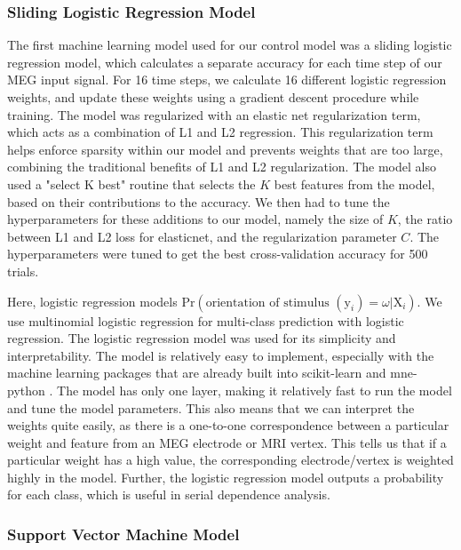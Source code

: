\documentclass[../main.tex]{subfiles}
\begin{document}
\subsubsection{Sliding Logistic Regression Model}
The first machine learning model used for our control model was a sliding logistic regression model, which calculates a separate accuracy for each time step of our MEG input signal. For 16 time steps, we calculate 16 different logistic regression weights, and update these weights using a gradient descent procedure while training. The model was regularized with an elastic net regularization term, which acts as a combination of L1 and L2 regression. This regularization term helps enforce sparsity within our model and prevents weights that are too large, combining the traditional benefits of L1 and L2 regularization. The model also used a "select K best" routine that selects the $K$ best features from the model, based on their contributions to the accuracy. We then had to tune the hyperparameters for these additions to our model, namely the size of $K$, the ratio between L1 and L2 loss for elasticnet, and the regularization parameter $C$. The hyperparameters were tuned to get the best cross-validation accuracy for 500 trials.

Here, logistic regression models $\mathrm{Pr}(\textrm{orientation of stimulus } (\mathrm{y}_i) = \omega | \mathrm{X}_i)$. We use multinomial logistic regression for multi-class prediction with logistic regression. The logistic regression model was used for its simplicity and interpretability. The model is relatively easy to implement, especially with the machine learning packages that are already built into scikit-learn \citep{scikit-learn} and mne-python \citep{mne}. The model has only one layer, making it relatively fast to run the model and tune the model parameters. This also means that we can interpret the weights quite easily, as there is a one-to-one correspondence between a particular weight and feature from an MEG electrode or MRI vertex. This tells us that if a particular weight has a high value, the corresponding electrode/vertex is weighted highly in the model. Further, the logistic regression model outputs a probability for each class, which is useful in serial dependence analysis.

\subsubsection{Support Vector Machine Model}
\end{document}
